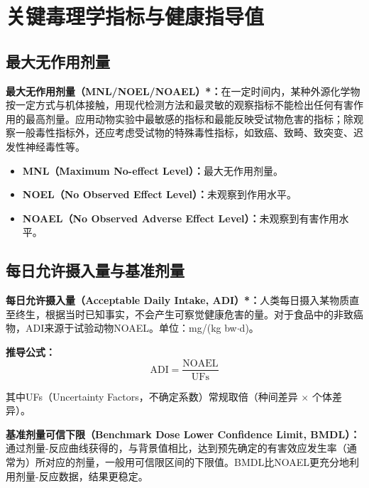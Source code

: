\section{关键毒理学指标与健康指导值}

\subsection{最大无作用剂量}

\begin{keybox}
\textbf{最大无作用剂量（MNL/NOEL/NOAEL）*：}在一定时间内，某种外源化学物按一定方式与机体接触，用现代检测方法和最灵敏的观察指标不能检出任何有害作用的最高剂量。应用动物实验中最敏感的指标和最能反映受试物危害的指标；除观察一般毒性指标外，还应考虑受试物的特殊毒性指标，如致癌、致畸、致突变、迟发性神经毒性等。

\begin{itemize}[leftmargin=*]
    \item \textbf{MNL（Maximum No-effect Level）：}最大无作用剂量。
    \item \textbf{NOEL（No Observed Effect Level）：}未观察到作用水平。
    \item \textbf{NOAEL（No Observed Adverse Effect Level）：}未观察到有害作用水平。
\end{itemize}
\end{keybox}

\subsection{每日允许摄入量与基准剂量}

\begin{keybox}
\textbf{每日允许摄入量（Acceptable Daily Intake, ADI）*：}人类每日摄入某物质直至终生，根据当时已知事实，不会产生可察觉健康危害的量。对于食品中的非致癌物，ADI来源于试验动物NOAEL。单位：mg/(kg bw$\cdot$d)。

\textbf{推导公式：}
\[
\text{ADI} = \frac{\text{NOAEL}}{\text{UFs}}
\]

其中UFs（Uncertainty Factors，不确定系数）常规取倍（种间差异 $\times$ 个体差异）。

\textbf{基准剂量可信下限（Benchmark Dose Lower Confidence Limit, BMDL）：}通过剂量-反应曲线获得的，与背景值相比，达到预先确定的有害效应发生率（通常为）所对应的剂量，一般用可信限区间的下限值。BMDL比NOAEL更充分地利用剂量-反应数据，结果更稳定。
\end{keybox}

